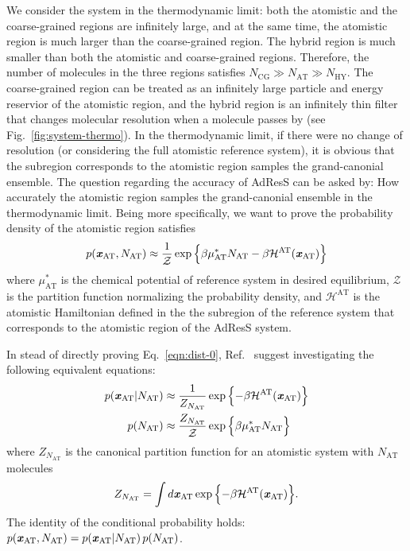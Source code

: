 \documentclass[epjST]{svjour}
\newcommand{\vect}[1]{\textbf{\textit{#1}}}
\newcommand{\mh}[0]{\mathcal {H}}
\newcommand{\AT}[0]{\textrm{AT}}
\newcommand{\HY}[0]{\textrm{HY}}
\newcommand{\CG}[0]{\textrm{CG}}
\begin{document}
We consider the system in the thermodynamic limit: both the atomistic
and the coarse-grained regions are infinitely large, and at the same
time, the atomistic region is much larger than the coarse-grained
region. The hybrid region is much smaller than both the atomistic and
coarse-grained regions.  Therefore, the number of molecules in the
three regions satisfies $N_\CG\gg N_\AT\gg N_\HY$.  The coarse-grained
region can be treated as an infinitely large particle and energy
reservior of the atomistic region, and the hybrid region is an
infinitely thin filter that changes molecular resolution when a
molecule passes by (see Fig.~\ref{fig:system-thermo}). In the
thermodynamic limit, if there were no change of resolution (or
considering the full atomistic reference system), it is obvious that
the subregion corresponds to the atomistic region samples the
grand-canonial ensemble.  The question regarding the accuracy of
AdResS can be asked by: How accurately the atomistic region samples
the grand-canonial ensemble in the thermodynamic limit. Being more
specifically, we want to prove the probability density of the atomistic region satisfies
\begin{align}\label{eqn:dist-0}
  p(\vect x_\AT, N_\AT) \approx \frac{1}{\mathcal Z} \exp\Big\{{\beta\mu^\ast_\AT N_\AT - \beta \mh^\AT(\vect x_\AT)} \Big\}
\end{align}
where $\mu^\ast_\AT$ is the chemical potential of reference system in
desired equilibrium, $\mathcal Z$ is the partition function
normalizing the probability density, and $\mh^\AT$ is the atomistic
Hamiltonian defined in the the subregion of the reference system that
corresponds to the atomistic region of the AdResS system.

In stead of directly proving Eq.~\eqref{eqn:dist-0}, Ref.~\cite{wang2013grand}
suggest investigating the following equivalent equations:
\begin{align}\label{eqn:dist-1-0}
  p(\vect x_\AT \vert N_\AT) &\approx \frac{1}{Z_{N_\AT}} \exp\Big\{{- \beta \mh^\AT(\vect x_\AT)}\Big\}  \\\label{eqn:dist-1-1}
  p(N_\AT) & \approx \frac{ Z_{N_\AT}}{\mathcal Z} \exp\Big\{{\beta\mu^\ast_\AT N_\AT}\Big\}
\end{align}
where $Z_{N_\AT}$ is the canonical partition function for an atomistic
system with $N_\AT$ molecules
\begin{align}
  Z_{N_\AT} = \int d\vect x_{\AT} \exp\Big\{{- \beta \mh^\AT(\vect x_\AT)}\Big\}.
\end{align}
The identity of the conditional probability holds: $ p(\vect x_\AT, N_\AT)  = p(\vect x_\AT \vert N_\AT) \, p(N_\AT) $.
\end{document}

